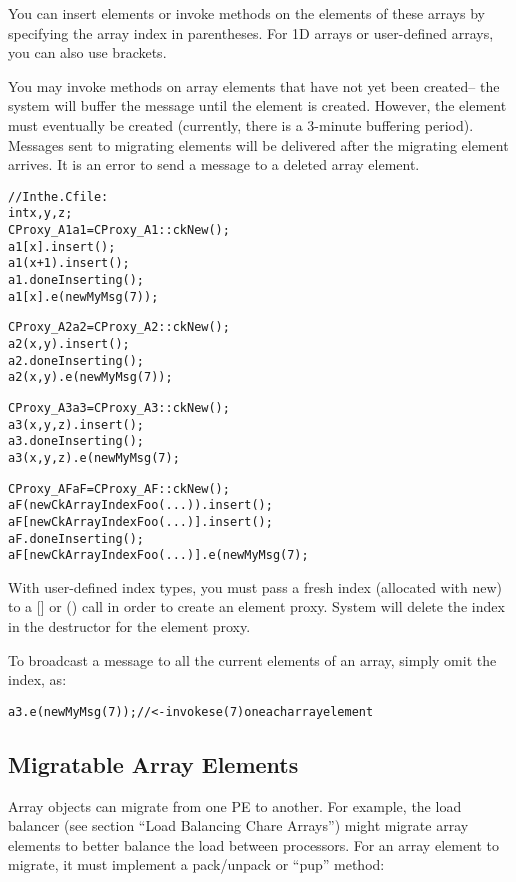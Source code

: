 You can insert elements or invoke methods on the elements of these
arrays by specifying the array index in parentheses.  For 1D 
arrays or user-defined arrays, you can also use brackets.

You may invoke methods on array elements that have not yet
been created-- the system will buffer the message until the
element is created.  However, the element must eventually be 
created (currently, there is a 3-minute buffering period).
Messages sent to migrating elements will be delivered after
the migrating element arrives.  It is an error to send 
a message to a deleted array element.

\begin{alltt}
//In the .C file:
int x,y,z;
CProxy_A1 a1=CProxy_A1::ckNew();
a1[x  ].insert(); 
a1(x+1).insert();
a1.doneInserting();
a1[x].e(new MyMsg(7));

CProxy_A2 a2=CProxy_A2::ckNew(); 
a2(x,y).insert();
a2.doneInserting();
a2(x,y).e(new MyMsg(7));

CProxy_A3 a3=CProxy_A3::ckNew();
a3(x,y,z).insert();
a3.doneInserting();
a3(x,y,z).e(new MyMsg(7);

CProxy_AF aF=CProxy_AF::ckNew();
aF(new CkArrayIndexFoo(...)).insert();
aF[new CkArrayIndexFoo(...)].insert();
aF.doneInserting();
aF[new CkArrayIndexFoo(...)].e(new MyMsg(7);

\end{alltt}

With user-defined index types, you must pass a fresh index 
(allocated with new) to a [] or () call in order to create an element proxy.
System will delete the index in the destructor for the element proxy.

To broadcast a message to all the current elements of an array, 
simply omit the index, as:

\begin{alltt}
a3.e(new MyMsg(7)); //<- invokes e(7) on each array element
\end{alltt}

\subsection{Migratable Array Elements}
Array objects can migrate from one PE to another.
For example, the load balancer (see section ``Load Balancing Chare Arrays'')
might migrate array elements to better balance the load between
processors.  For an array element to migrate, it must implement
a pack/unpack or ``pup'' method:

